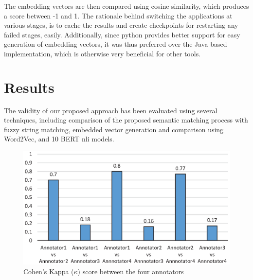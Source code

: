 \documentclass{ieeeaccess}
\begin{document}
The embedding vectors are then compared using cosine similarity, which produces a score between -1 and 1.
The rationale behind switching the applications at various stages, is to cache the results and create checkpoints for restarting any failed stages, easily. Additionally, since python provides better support for easy generation of embedding vectors, it was thus preferred over the Java based implementation, which is otherwise very beneficial for other tools.

\section{Results}
\label{results}

The validity of our proposed approach has been evaluated using several techniques, including comparison of the proposed semantic matching process with fuzzy string matching, embedded vector generation and comparison using Word2Vec, and 10 BERT nli models. 

\begin{figure}[htb!]
	\centering
	\includegraphics[width=\columnwidth]{kappaInterAnnotatorAgrement}
	\caption{Cohen's Kappa ($\kappa$) score between the four annotators}
	\label{fig:kappaInterAnnotatorAgrement}
\end{figure}
\end{document}

